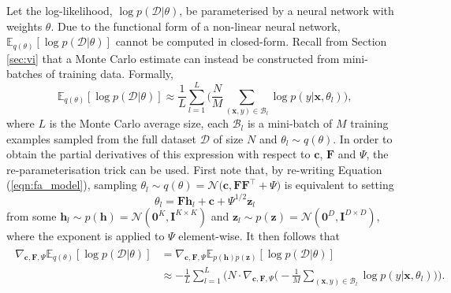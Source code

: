 \documentclass[msc,deptreport.inf]{infthesis} %
\newcommand{\matr}[1]{\mathbf{#1}}
\newcommand{\E}{\mathbb E}
\begin{document}
Let the log-likelihood, $\log p(\mathcal{D} | \theta)$, be parameterised by a neural network with weights $\theta$. Due to the functional form of a non-linear neural network, $\E_{q(\theta)} [\log p(\mathcal{D} | \theta)]$ cannot be computed in closed-form. Recall from Section \ref{sec:vi} that a Monte Carlo estimate can instead be constructed from mini-batches of training data. Formally, 
\begin{equation}
	 \E_{q(\theta)} [\log p(\mathcal{D} | \theta)]
	\approx \frac{1}{L} \sum_{l=1}^{L} \Bigg( \frac{N}{M} \sum_{(\matr{x}, y) \in \mathcal{B}_l} \log p(y | \matr{x}, \theta_l) \Bigg),
\end{equation}
where $L$ is the Monte Carlo average size, each $\mathcal{B}_l$ is a mini-batch of $M$ training examples sampled from the full dataset $\mathcal{D}$ of size $N$ and $\theta_l \sim q(\theta)$. In order to obtain the partial derivatives of this expression with respect to $\matr{c}$, $\matr{F}$ and $\Psi$, the re-parameterisation trick \cite{goodfellow2016} can be used. First note that, by re-writing Equation (\ref{eqn:fa_model}), sampling $\theta_l \sim q(\theta) = \mathcal{N}\big(\matr{c}, \matr{FF}^{\intercal} + \Psi\big)$ is equivalent to setting  
\begin{equation}\label{eqn:fa_reparam_trick}
	\theta_l = \matr{F}\matr{h}_l + \matr{c} + \Psi^{1/2} \matr{z}_l
\end{equation}
from some $\matr{h}_l \sim p(\matr{h}) = \mathcal{N}(\matr{0}^K, \matr{I}^{K \times K})$ and $\matr{z}_l \sim p(\matr{z}) = \mathcal{N}(\matr{0}^D, \matr{I}^{D \times D})$, where the exponent is applied to $\Psi$ element-wise. 
It then follows that
\begin{align}
\begin{split}\label{eqn:expected_grad_log_likelihood}
	\nabla_{\matr{c}, \matr{F}, \Psi} \E_{q(\theta)} [\log p(\mathcal{D} | \theta)]
	& = \nabla_{\matr{c}, \matr{F}, \Psi} \E_{p(\matr{h})p(\matr{z})} [\log p(\mathcal{D} | \theta)] \\
	& \approx -\frac{1}{L} \sum_{l=1}^{L} \Bigg(N \cdot \nabla_{\matr{c}, \matr{F}, \Psi} \Bigg( -\frac{1}{M} \sum_{(\matr{x}, y) \in \mathcal{B}_l} \log p(y | \matr{x}, \theta_l) \Bigg) \Bigg).
\end{split}
\end{align}
\end{document}

